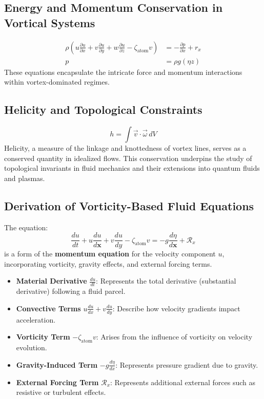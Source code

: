     \subsection{Energy and Momentum Conservation in Vortical Systems}
    \begin{align}
        \rho \left( u \frac{\partial u}{\partial x} + v \frac{\partial u}{\partial y} + w \frac{\partial u}{\partial z} - \zeta_\text{atom} v \right) &= -\frac{\partial p}{\partial x} + r_x \\
        p &= \rho g(\eta z)
    \end{align}
    These equations encapsulate the intricate force and momentum interactions within vortex-dominated regimes.


\subsection{Helicity and Topological Constraints}
$$h = \int \vec{v} \cdot \vec{\omega} \, dV$$
 Helicity, a measure of the linkage and knottedness of vortex lines, serves as a conserved quantity in idealized flows. This conservation underpins the study of topological invariants in fluid mechanics and their extensions into quantum fluids and plasmas.


    \subsection{Derivation of Vorticity-Based Fluid Equations}
    The equation:
    \begin{equation}
        \frac{d u}{d t}+u \frac{d u}{d \boldsymbol{x}}+v \frac{d u}{d y}-\zeta_{\text {atom}} v=-g \frac{d \eta}{d \boldsymbol{x}}+\mathcal{R}_x
    \end{equation}
    is a form of the \textbf{momentum equation} for the velocity component $u$, incorporating vorticity, gravity effects, and external forcing terms.

    \begin{itemize}
        \item \textbf{Material Derivative} $\frac{d u}{d t}$: Represents the total derivative (substantial derivative) following a fluid parcel.
        \item \textbf{Convective Terms} $u \frac{d u}{dx} + v \frac{d u}{dy}$: Describe how velocity gradients impact acceleration.
        \item \textbf{Vorticity Term} $-\zeta_{\text{atom}} v$: Arises from the influence of vorticity on velocity evolution.
        \item \textbf{Gravity-Induced Term} $-g \frac{d \eta}{d x}$: Represents pressure gradient due to gravity.
        \item \textbf{External Forcing Term} $\mathcal{R}_x$: Represents additional external forces such as resistive or turbulent effects.
    \end{itemize}

